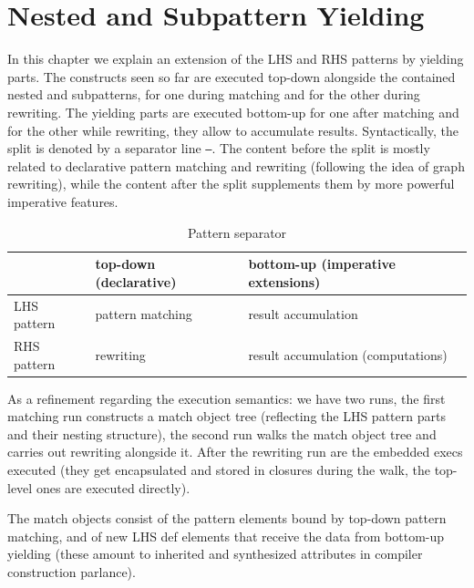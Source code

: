\chapter{Nested and Subpattern Yielding}%
\label{cha:yielding}

In this chapter we explain an extension of the LHS and RHS patterns by yielding parts.
The constructs seen so far are executed top-down alongside the contained nested and subpatterns, for one during matching and for the other during rewriting.
The yielding parts are executed bottom-up for one after matching and for the other while rewriting, they allow to accumulate results.
Syntactically, the split is denoted by a separator line \texttt{---}.
The content before the split is mostly related to declarative pattern matching and rewriting (following the idea of graph rewriting), while the content after the split supplements them by more powerful imperative features.

\begin{table}[htbp]
  \centering
  \begin{tabularx}{\linewidth}{|l|X|X|} 
		\hline
     & top-down (declarative) & bottom-up (imperative extensions) \\
		\hline
    LHS pattern & pattern matching & result accumulation \\
		\hline
    RHS pattern & rewriting & result accumulation (computations) \\
		\hline
  \end{tabularx}
  \caption{Pattern separator}
  \label{patternsepar}
\end{table}

As a refinement regarding the execution semantics:
we have two runs, the first matching run constructs a match object tree (reflecting the LHS pattern parts and their nesting structure),
the second run walks the match object tree and carries out rewriting alongside it.
After the rewriting run are the embedded execs executed (they get encapsulated and stored in closures during the walk, the top-level ones are executed directly).

The match objects consist of the pattern elements bound by top-down pattern matching,
and of new LHS def elements that receive the data from bottom-up yielding
(these amount to inherited and synthesized attributes in compiler construction parlance).

